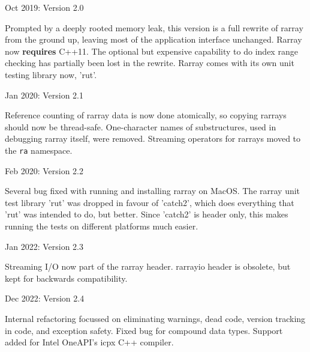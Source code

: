 \documentclass[11pt,twoside]{article}
\begin{document}
\noindent
Oct 2019: Version 2.0

Prompted by a deeply rooted memory leak, this version is a full
rewrite of rarray from the ground up, leaving most of the application
interface unchanged.  Rarray now \textbf{requires} C++11.
The optional but expensive capability to do index range checking has
partially been lost in the rewrite.  Rarray comes with its own unit testing
library now, 'rut'.

\noindent
Jan 2020: Version 2.1

Reference counting of rarray data is now done atomically, so copying
rarrays should now be thread-safe.  One-character names of
substructures, used in debugging rarray itself, were
removed. Streaming operators for rarrays moved to the \texttt{ra}
namespace.

\noindent
Feb 2020: Version 2.2

Several bug fixed with running and installing rarray on MacOS.  The
rarray unit test library 'rut' was dropped in favour of 'catch2',
which does everything that 'rut' was intended to do, but better. Since
'catch2' is header only, this makes running the tests on different
platforms much easier.

\noindent
Jan 2022: Version 2.3

Streaming I/O now part of the rarray header. rarrayio header is
obsolete, but kept for backwards compatibility. 

\noindent
Dec 2022: Version 2.4

Internal refactoring focussed on eliminating warnings, dead code,
version tracking in code, and exception safety.
Fixed bug for compound data types.
Support added for Intel OneAPI's icpx C++ compiler.
\end{document}
